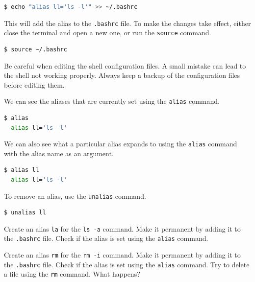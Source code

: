 \begin{lstlisting}[language=bash]
  $ echo "alias ll='ls -l'" >> ~/.bashrc
\end{lstlisting}

This will add the alias to the \texttt{.bashrc} file.
To make the changes take effect, either close the terminal and open a new one, or run the \texttt{source} command.

\begin{lstlisting}[language=bash]
  $ source ~/.bashrc
\end{lstlisting}


\begin{warn}
  Be careful when editing the shell configuration files.
  A small mistake can lead to the shell not working properly.
  Always keep a backup of the configuration files before editing them.
\end{warn}

We can see the aliases that are currently set using the \texttt{alias} command.

\begin{lstlisting}[language=bash]
  $ alias
  alias ll='ls -l'
\end{lstlisting}

We can also see what a particular alias expands to using the \texttt{alias} command with the alias name as an argument.

\begin{lstlisting}[language=bash]
  $ alias ll
  alias ll='ls -l'
\end{lstlisting}

To remove an alias, use the \texttt{unalias} command.

\begin{lstlisting}[language=bash]
  $ unalias ll
\end{lstlisting}

\begin{exercise}
  Create an alias \texttt{la} for the \texttt{ls -a} command.
  Make it permanent by adding it to the \texttt{.bashrc} file.
  Check if the alias is set using the \texttt{alias} command.
\end{exercise}

\begin{exercise}
  Create an alias \texttt{rm} for the \texttt{rm -i} command.
  Make it permanent by adding it to the \texttt{.bashrc} file.
  Check if the alias is set using the \texttt{alias} command.
  Try to delete a file using the \texttt{rm} command.
  What happens?
\end{exercise}

